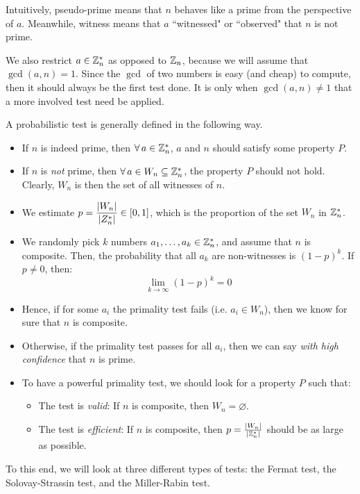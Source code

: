 \documentclass{article}
\begin{document}
Intuitively, pseudo-prime means that $ n $ behaves like a prime from the perspective of $ a $.
Meanwhile, witness means that $ a $ ``witnessed" or ``observed" that $ n $ is not prime.

We also restrict $ a \in \mathbb{Z}_{n}^{*} $ as opposed to $ \mathbb{Z}_{n} $, because we will assume
that $ \gcd(a, n) = 1 $. Since the $ \gcd $ of two numbers is easy (and cheap) to compute, then it
should always be the first test done. It is only when $ \gcd(a, n) \neq 1 $ that a more involved
test need be applied.

\newpage
A probabilistic test is generally defined in the following way.
\begin{itemize}
    \item If $ n $ is indeed prime, then $ \forall \,  a \in \mathbb{Z}_{n}^{*} $,
        $ a $ and $ n $ should satisfy some property $ P $.
    \item If $ n $ is \textit{not} prime, then $ \forall \, a \in W_{n} \subseteq \mathbb{Z}_{n}^{*} $,
        the property $ P $ should not hold. Clearly, $ W_{n} $ is then the set of all witnesses of
        $ n $.
    \item We estimate $ p = \dfrac{\abs{W_{n}}}{\abs{Z_{n}^{*}}} \in [0, 1] $, which is the
        proportion of the set $ W_{n} $ in $ \mathbb{Z}_{n}^{*} $.
    \item We randomly pick $ k $ numbers $ a_{1}, \dots, a_{k} \in \mathbb{Z}_{n}^{*} $, and assume
        that $ n $ is composite. Then, the probability that all $ a_{k} $ are non-witnesses is
        $ (1-p)^{k} $. If $ p \neq 0 $, then:
        \begin{equation*}
            \lim_{k \rightarrow \infty} (1-p)^{k} = 0
        \end{equation*}
    \item Hence, if for some $ a_{i} $ the primality test fails (i.e. $ a_{i} \in W_{n} $),
        then we know for sure that $ n $ is composite.
    \item Otherwise, if the primality test passes for all $ a_{i} $, then we can say
        \textit{with high confidence} that $ n $ is prime.
    \item To have a powerful primality test, we should look for a property $ P $ such that:
        \begin{itemize}
            \item The test is \textit{valid}: If $ n $ is composite, then $ W_{n} = \varnothing $.
            \item The test is \textit{efficient}: If $ n $ is composite, then
                $ p = \frac{\abs{W_{n}}}{\abs{\mathbb{Z}_{n}^{*}}} $ should be as large as possible.
        \end{itemize}
\end{itemize}
To this end, we will look at three different types of tests: the Fermat test,
the Solovay-Strassin test, and the Miller-Rabin test.
\end{document}

